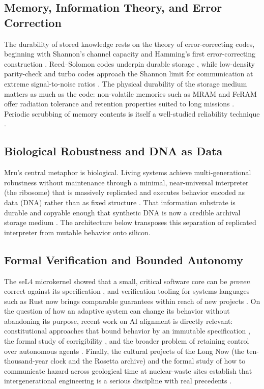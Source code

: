\documentclass[10pt, a4paper]{article}
\begin{document}
\subsection{Memory, Information Theory, and Error Correction}

The durability of stored knowledge rests on the theory of error-correcting codes, beginning with Shannon's channel capacity and Hamming's first error-correcting construction \cite{shannon1948, hamming1950}. Reed--Solomon codes underpin durable storage \cite{reedsolomon1960}, while low-density parity-check and turbo codes approach the Shannon limit for communication at extreme signal-to-noise ratios \cite{gallager1962, berrou1993}. The physical durability of the storage medium matters as much as the code: non-volatile memories such as MRAM and FeRAM offer radiation tolerance and retention properties suited to long missions \cite{gerardin2010}. Periodic scrubbing of memory contents is itself a well-studied reliability technique \cite{saleh1990}.

\subsection{Biological Robustness and DNA as Data}

Mru's central metaphor is biological. Living systems achieve multi-generational robustness without maintenance through a minimal, near-universal interpreter (the ribosome) that is massively replicated and executes behavior encoded as data (DNA) rather than as fixed structure \cite{alberts2014}. That information substrate is durable and copyable enough that synthetic DNA is now a credible archival storage medium \cite{church2012, goldman2013}. The architecture below transposes this separation of replicated interpreter from mutable behavior onto silicon.

\subsection{Formal Verification and Bounded Autonomy}

The seL4 microkernel showed that a small, critical software core can be \textit{proven} correct against its specification \cite{klein2009}, and verification tooling for systems languages such as Rust now brings comparable guarantees within reach of new projects \cite{astrauskas2019, kani2024}. On the question of how an adaptive system can change its behavior without abandoning its purpose, recent work on AI alignment is directly relevant: constitutional approaches that bound behavior by an immutable specification \cite{bai2022}, the formal study of corrigibility \cite{soares2015}, and the broader problem of retaining control over autonomous agents \cite{russell2019}. Finally, the cultural projects of the Long Now (the ten-thousand-year clock and the Rosetta archive) and the formal study of how to communicate hazard across geological time at nuclear-waste sites establish that intergenerational engineering is a serious discipline with real precedents \cite{brand1999, rosetta, trauth1993}.
\end{document}
